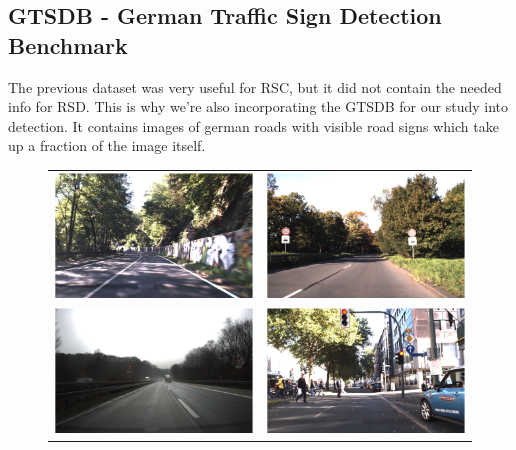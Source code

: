 \documentclass[12pt, landscape]{article}
\begin{document}
\begin{multicols}{3}
\subsection{GTSDB - German Traffic Sign Detection Benchmark}
The previous dataset was very useful for RSC, but it did not contain the needed
info for RSD. This is why we're also incorporating the GTSDB for our study into
detection. It contains images of german roads with visible road signs which take
up a fraction of the image itself.
\begin{figure}[H]
    \centering
    \begin{tabular}{cc}
    \includegraphics[scale=0.5]{example1.png}&\includegraphics[scale=0.5]{example2.png}\\
    \includegraphics[scale=0.5]{example4.png}&\includegraphics[scale=0.5]{example3.png}\\

\end{tabular}
\end{figure}
\end{multicols}
\end{document}
